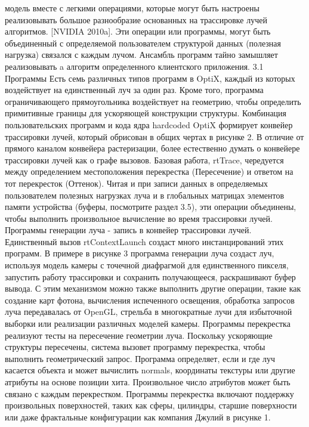 модель вместе с легкими операциями, которые могут быть настроены
реализовывать большое разнообразие основанных на трассировке лучей алгоритмов.
[NVIDIA 2010a]. Эти операции или программы, могут быть
объединенный с определяемой пользователем структурой данных (полезная нагрузка) связался
с каждым лучом. Ансамбль программ тайно замышляет реализовывать a
алгоритм определенного клиентского приложения.
3.1 Программы
Есть семь различных типов программ в OptiX, каждый из которых воздействует на единственный луч за один раз. Кроме того, программа ограничивающего прямоугольника воздействует на геометрию, чтобы определить примитивные границы для ускоряющей конструкции структуры. Комбинация пользовательских программ и кода ядра hardcoded OptiX формирует конвейер трассировки лучей, который обрисован в общих чертах в рисунке 2. В отличие от прямого каналом конвейера растеризации, более естественно думать о конвейере трассировки лучей как о графе вызовов. Базовая работа, rtTrace, чередуется между определением местоположения перекрестка (Пересечение) и ответом на тот перекресток (Оттенок). Читая и при записи данных в определяемых пользователем полезных нагрузках луча и в глобальных матрицах элементов памяти устройства (буферы, посмотрите раздел 3.5), эти операции объединены, чтобы выполнить произвольное вычисление во время трассировки лучей. Программы генерации луча - запись в конвейер трассировки лучей. Единственный вызов rtContextLaunch создаст много инстанцирований этих программ. В примере в рисунке 3 программа генерации луча создаст луч, используя модель камеры с точечной диафрагмой для единственного пикселя, запустить работу трассировки и сохранить получающееся, раскрашивают буфер вывода. С этим механизмом можно также выполнить другие операции, такие как создание карт фотона, вычисления испеченного освещения, обработка запросов луча передавалась от OpenGL, стрельба в многократные лучи для избыточной выборки или реализации различных моделей камеры. Программы перекрестка реализуют тесты на пересечение геометрии луча. Поскольку ускоряющие структуры пересечены, система вызовет программу перекрестка, чтобы выполнить геометрический запрос. Программа определяет, если и где луч касается объекта и может вычислить normals, координаты текстуры или другие атрибуты на основе позиции хита. Произвольное число атрибутов может быть связано с каждым перекрестком. Программы перекрестка включают поддержку произвольных поверхностей, таких как сферы, цилиндры, старшие поверхности или даже фрактальные конфигурации как компания Джулий в рисунке 1.
